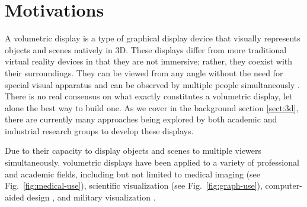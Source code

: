 \section{Motivations}
A volumetric display is a type of graphical display device that visually represents objects and scenes natively in 3D. These displays differ from more traditional virtual reality devices in that they are not immersive; rather, they coexist with their surroundings. They can be viewed from any angle without the need for special visual apparatus and can be observed by multiple people simultaneously \cite{1492264}. There is no real consensus on what exactly constitutes a volumetric display, let alone the best way to build one. As we cover in the background section \ref{sect:3d}, there are currently many approaches being explored by both academic and industrial research groups to develop these displays.

 
\begin{invisBox}
	\hfill
\end{invisBox}

Due to their capacity to display objects and scenes to multiple viewers simultaneously, volumetric displays have been applied to a variety of professional and academic fields, including but not limited to medical imaging \cite{Gong2009-vc} (see Fig.~\ref{fig:medical-use}), scientific visualization (see Fig.~\ref{fig:graph-use}), computer-aided design \cite{stickland_development_2003}, and military visualization \cite{10.1117/12.785009} \cite{1492264} \cite{noauthor_bae_nodate}. \\

